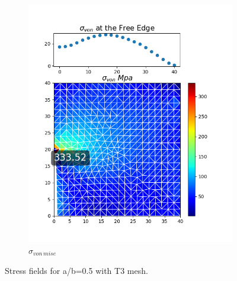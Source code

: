 \documentclass[twoside,twocolumn,10pt]{article}
\begin{document}
\begin{figure}[!ht]
\begin{subfigure}[c]{0.26\textwidth}
    \includegraphics[width=1.\linewidth]{Q2_5/Q5_0.05_von_triangle.png}
    \caption{$\sigma_{von \, mise}$}
    \label{fig:von_triangle_0.05}
  \end{subfigure}
  \caption{Stress fields for a/b=0.5 with T3 mesh.}
  \label{fig:triangle_0.05}
\end{figure}
\end{document}
